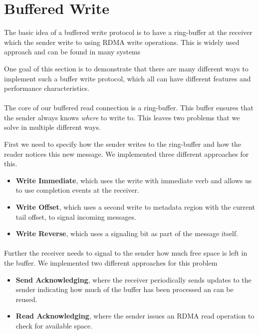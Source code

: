 \section{Buffered Write} \label{sec:conn:buf_write}

The basic idea of a buffered write protocol is to have a ring-buffer at the receiver which the sender write to using
RDMA write operations. This is widely used approach and can be found in many systems~\cite{herd, scal-rdma-rpc}

One goal of this section is to demonstrate that there are many different ways to implement such a buffer write 
protocol, which all can have different features and performance characteristics.


\paragraph{}The core of our buffered read connection is a ring-buffer. This buffer ensures that the sender always knows 
\emph{where} to  write to. This leaves two problems that we solve in multiple different ways.

First we need to specify how the sender writes to the ring-buffer and how the reader notices this new message. We 
implemented three different approaches for this. 
\begin{itemize}
  \item \textbf{Write Immediate}, which uses the write with immediate verb and allows us to use completion 
    events at the receiver.
  \item \textbf{Write Offset}, which uses a second write to metadata region with the current tail offset,
    to signal incoming messages.
  \item \textbf{Write Reverse}, which uses a signaling bit as part of the message itself.
\end{itemize}
 

\paragraph{} Further the receiver needs to signal to the sender how much free space is left in the buffer. We implemented 
two different approaches for this problem

\begin{itemize}
  \item \textbf{Send Acknowledging}, where the receiver periodically sends updates to the sender indicating how much of
    the buffer has been processed an can be reused.
  \item \textbf{Read Acknowledging}, where the sender issues an RDMA read operation to check for available space.
\end{itemize}

